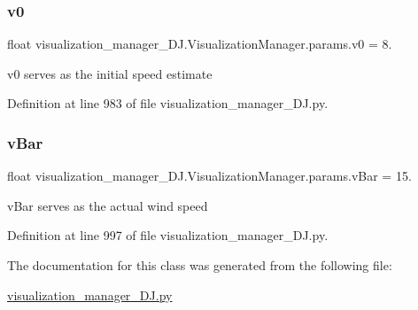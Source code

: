 \subsubsection{\texorpdfstring{v0}{v0}}
{\footnotesize\ttfamily float visualization\+\_\+manager\+\_\+\+D\+J.\+Visualization\+Manager.\+params.\+v0 = 8.\hspace{0.3cm}{\ttfamily [static]}}



v0 serves as the initial speed estimate 



Definition at line 983 of file visualization\+\_\+manager\+\_\+\+D\+J.\+py.

\mbox{\label{classvisualization__manager___d_j_1_1_visualization_manager_1_1params_a468678d5806ec035d997a40604e291f2}} 
\subsubsection{\texorpdfstring{v\+Bar}{vBar}}
{\footnotesize\ttfamily float visualization\+\_\+manager\+\_\+\+D\+J.\+Visualization\+Manager.\+params.\+v\+Bar = 15.\hspace{0.3cm}{\ttfamily [static]}}



v\+Bar serves as the \textquotesingle{}actual\textquotesingle{} wind speed 



Definition at line 997 of file visualization\+\_\+manager\+\_\+\+D\+J.\+py.



The documentation for this class was generated from the following file\+:\begin{DoxyCompactItemize}
\item 
\mbox{\hyperlink{visualization__manager___d_j_8py}{visualization\+\_\+manager\+\_\+\+D\+J.\+py}}\end{DoxyCompactItemize}
